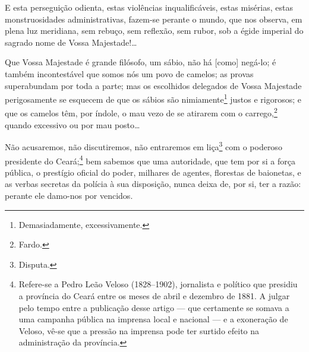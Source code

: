 E esta perseguição odienta, estas violências inqualificáveis, estas
misérias, estas monstruosidades administrativas, fazem-se perante o
mundo, que nos observa, em plena luz meridiana, sem rebuço, sem
reflexão, sem rubor, sob a égide imperial do sagrado nome de Vossa
Majestade!\ldots{}

Que Vossa Majestade é grande filósofo, um sábio, não há {[}como{]} %
negá-lo; é também incontestável que somos nós um povo de
camelos; as provas superabundam por toda a parte; mas os escolhidos
delegados de Vossa Majestade perigosamente se esquecem de que os sábios
são nimiamente\footnote{Demasiadamente, excessivamente.} justos e
rigorosos; e que os camelos têm, por índole, o mau vezo de se
atirarem com o carrego,\footnote{Fardo.} quando excessivo ou por mau
posto\ldots{}

Não acusaremos, não discutiremos, não entraremos em liça\footnote{
  Disputa.} com o poderoso presidente do Ceará;\footnote{Refere-se a
  Pedro Leão Veloso (1828--1902), jornalista e político que presidiu a
  província do Ceará entre os meses de abril e dezembro de 1881. A
  julgar pelo tempo entre a publicação desse artigo --- que certamente se
  somava a uma campanha pública na imprensa local e nacional --- e a
  exoneração de Veloso, vê-se que a pressão na imprensa pode ter surtido
  efeito na administração da província.} bem sabemos que uma autoridade,
que tem por si a força pública, o prestígio oficial do poder, milhares
de agentes, florestas de baionetas, e as verbas secretas da polícia à
sua disposição, nunca deixa de, por si, ter a razão: perante ele
damo-nos por vencidos.

